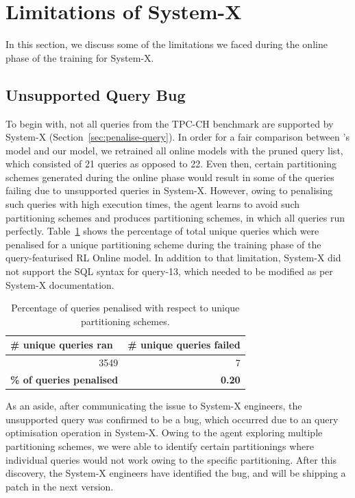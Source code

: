 \section{Limitations of System-X}
\label{sec:sysx-limitations}
In this section, we discuss some of the limitations we faced during the online phase of the training for System-X. 

\subsection{Unsupported Query Bug}
To begin with, not all queries from the TPC-CH benchmark are supported by System-X (Section~\ref{sec:penalise-query}). In order for a fair comparison between \citeauthor{Hilprecht:2019:TLP:3329859.3329876}'s model and our model, we retrained all online models with the pruned query list, which consisted of 21 queries as opposed to 22. Even then, certain partitioning schemes generated during the online phase would result in some of the queries failing due to unsupported queries in System-X. However, owing to penalising such queries with high execution times, the agent learns to avoid such partitioning schemes and produces partitioning schemes, in which all queries run perfectly. Table~\ref{tab:query-penalised} shows the percentage of total unique queries which were penalised for a unique partitioning scheme during the training phase of the query-featurised RL Online model. In addition to that limitation, System-X did not support the SQL syntax for query-13, which needed to be modified as per System-X documentation. 
\begin{table}[ht]
 \centering
\begin{tabular}{|rr|}
\hline
\multicolumn{1}{|l|}{\textbf{\# unique queries ran}} & \multicolumn{1}{l|}{\textbf{\# unique queries failed}} \\ \hline
\multicolumn{1}{|r|}{3549}                           & 7                                                      \\ \hhline{|=|=|}
\textbf{\% of queries penalised}                     & \textbf{0.20}                                          \\ \hline
\end{tabular}
    \caption{Percentage of queries penalised with respect to unique partitioning schemes.}
    \label{tab:query-penalised}
\end{table}

As an aside, after communicating the issue to System-X engineers, the unsupported query was confirmed to be a bug, which occurred due to an query optimisation operation in System-X. Owing to the agent exploring multiple partitioning schemes, we were able to identify certain partitionings where individual queries would not work owing to the specific partitioning. After this discovery, the System-X engineers have identified the bug, and will be shipping a patch in the next version. 

